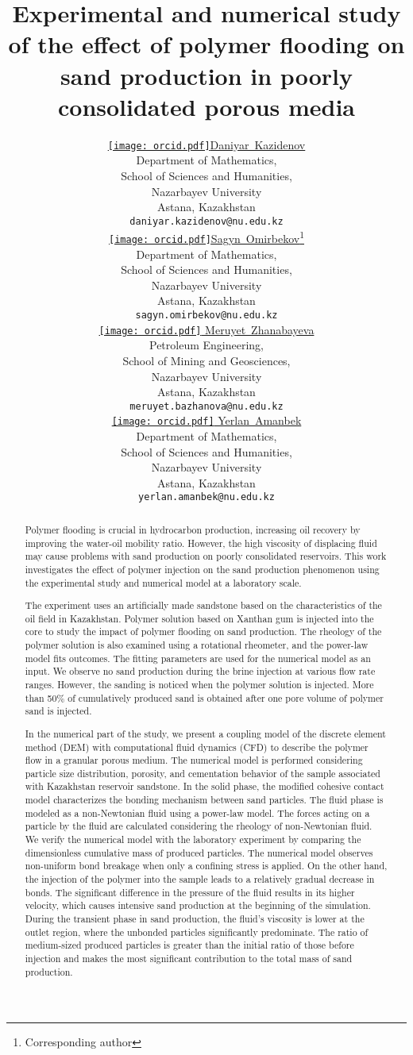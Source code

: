 \documentclass{article}
\title{Experimental and numerical study of the effect of polymer flooding on sand production in poorly consolidated porous media}
\author{ \href{https://orcid.org/0000-0001-8885-9511}{\texttt{[image: orcid.pdf]}\hspace{1mm}Daniyar~Kazidenov }\\
	Department of Mathematics, \\
    School of Sciences and Humanities,\\
	Nazarbayev University\\
	Astana, Kazakhstan \\
	\texttt{daniyar.kazidenov@nu.edu.kz} \\
	\And
	\href{https://orcid.org/0000-0003-2277-7390}{\texttt{[image: orcid.pdf]}\hspace{1mm}Sagyn~Omirbekov}\thanks{Corresponding author}  \\
	Department of Mathematics, \\
    School of Sciences and Humanities,\\
	Nazarbayev University\\
	Astana, Kazakhstan \\
	\texttt{sagyn.omirbekov@nu.edu.kz} \\
  	\And
	\href{https://orcid.org/0000-0002-5242-0440}{\texttt{[image: orcid.pdf]}
    \hspace{1mm}Meruyet~Zhanabayeva} \\
	Petroleum Engineering,\\ 
    School of Mining and Geosciences,\\
	Nazarbayev University\\
	Astana, Kazakhstan \\
	\texttt{meruyet.bazhanova@nu.edu.kz} \\
 	\And
	\href{https://orcid.org/0000-0002-3958-8871}{\texttt{[image: orcid.pdf]}
    \hspace{1mm}Yerlan~Amanbek} \\
	Department of Mathematics,\\
    School of Sciences and Humanities, \\
	Nazarbayev University\\
	Astana, Kazakhstan \\
	\texttt{yerlan.amanbek@nu.edu.kz} \\
}
\begin{document}
\maketitle
\begin{abstract}
	
    Polymer flooding is crucial in hydrocarbon production, increasing oil recovery by improving the water-oil mobility ratio. However, the high viscosity of displacing fluid may cause problems with sand production on poorly consolidated reservoirs.  
     This work investigates the effect of polymer injection on the sand production phenomenon using the experimental study and numerical model at a laboratory scale.
    
    
    The experiment uses an artificially made sandstone based on the characteristics of the oil field in Kazakhstan. Polymer solution based on Xanthan gum is injected into the core to study the impact of polymer flooding on sand production. The rheology of the polymer solution is also examined using a rotational rheometer, and the power-law model fits outcomes. The fitting parameters are used for the numerical model as an input. We observe no sand production during the brine injection at various flow rate ranges. However, the sanding is noticed when the polymer solution is injected. More than 50\% of cumulatively produced sand is obtained after one pore volume of polymer sand is injected.
    
     In the numerical part of the study, we present a coupling model of the discrete element method (DEM) with computational fluid dynamics (CFD) to describe the polymer flow in a granular porous medium. The numerical model is performed considering particle size distribution, porosity, and cementation behavior of the sample associated with Kazakhstan reservoir sandstone. In the solid phase, the modified cohesive contact model characterizes the bonding mechanism between sand particles. The fluid phase is modeled as a non-Newtonian fluid using a power-law model. The forces acting on a particle by the fluid are calculated considering the rheology of non-Newtonian fluid.
     We verify the numerical model with the laboratory experiment by comparing the dimensionless cumulative mass of produced particles. The numerical model observes non-uniform bond breakage when only a confining stress is applied. On the other hand, the injection of the polymer into the sample leads to a relatively gradual decrease in bonds. The significant difference in the pressure of the fluid results in its higher velocity, which causes intensive sand production at the beginning of the simulation. During the transient phase in sand production, the fluid's viscosity is lower at the outlet region, where the unbonded particles significantly predominate. The ratio of medium-sized produced particles is greater than the initial ratio of those before injection and makes the most significant contribution to the total mass of sand production.   \\


\end{abstract}
\end{document}
